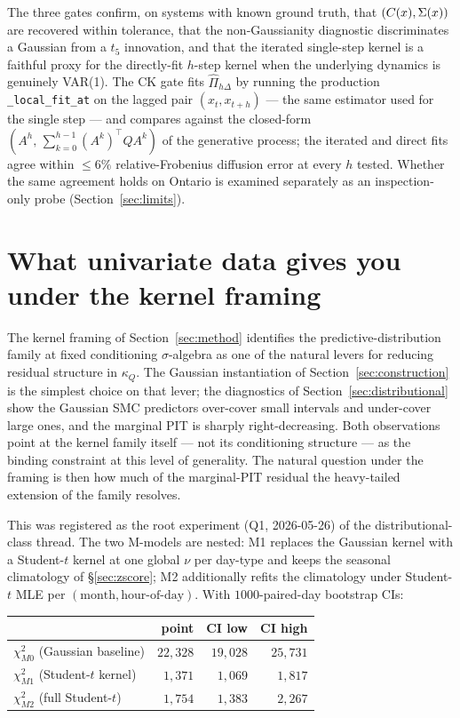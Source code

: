 \noindent
The three gates confirm, on systems with known ground truth, that
\((C(x), \Sigma(x))\) are recovered within tolerance, that the
non-Gaussianity diagnostic discriminates a Gaussian from a \(t_5\)
innovation, and that the iterated single-step kernel is a faithful
proxy for the directly-fit \(h\)-step kernel when the underlying
dynamics is genuinely VAR(1). The CK gate fits
\(\widehat{\Pi}_{h\Delta}\) by running the production
\texttt{\_local\_fit\_at} on the lagged pair \((x_t, x_{t+h})\) ---
the same estimator used for the single step --- and compares against
the closed-form \((A^{h},\, \sum_{k=0}^{h-1}(A^{k})^{\top}Q A^{k})\)
of the generative process; the iterated and direct fits agree within
\(\le 6\%\) relative-Frobenius diffusion error at every \(h\) tested.
Whether the same agreement holds on Ontario is examined separately as
an inspection-only probe (Section~\ref{sec:limits}).

\section{What univariate data gives you under the kernel framing}
\label{sec:univariate-extent}

The kernel framing of Section~\ref{sec:method} identifies the
predictive-distribution family at fixed conditioning $\sigma$-algebra
as one of the natural levers for reducing residual structure in
$\kappa_Q$. The Gaussian instantiation of
Section~\ref{sec:construction} is the simplest choice on that
lever; the diagnostics of Section~\ref{sec:distributional} show
the Gaussian SMC predictors over-cover small intervals and
under-cover large ones, and the marginal PIT is sharply
right-decreasing. Both observations point at the kernel family
itself --- not its conditioning structure --- as the binding
constraint at this level of generality. The natural question
under the framing is then how much of the marginal-PIT residual
the heavy-tailed extension of the family resolves.

This was registered as the root experiment (Q1, 2026-05-26) of
the distributional-class thread. The two M-models are nested: M1
replaces the Gaussian kernel with a Student-$t$ kernel at one
global $\nu$ per day-type and keeps the seasonal climatology of
\S\ref{sec:zscore}; M2 additionally refits the climatology under
Student-$t$ MLE per $(\text{month}, \text{hour-of-day})$. With
$1000$-paired-day bootstrap CIs:

\begin{center}
\begin{tabular}{lrrr}
\toprule
                                       & point      & CI low     & CI high   \\
\midrule
$\chi^{2}_{M0}$ (Gaussian baseline)    & $22{,}328$ & $19{,}028$ & $25{,}731$ \\
$\chi^{2}_{M1}$ (Student-$t$ kernel)   & $1{,}371$  & $1{,}069$  & $1{,}817$  \\
$\chi^{2}_{M2}$ (full Student-$t$)     & $1{,}754$  & $1{,}383$  & $2{,}267$  \\
\bottomrule
\end{tabular}
\end{center}

